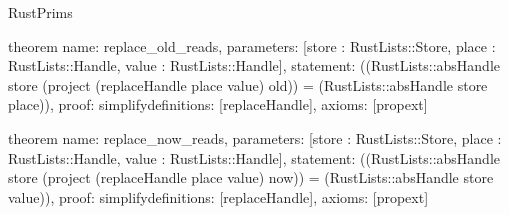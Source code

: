 \begin{lexlean}{RustPrims}
\begin{semanticmodule}
theorem{
  name: replace_old_reads,
  parameters: [store : RustLists::Store, place : RustLists::Handle, value : RustLists::Handle],
  statement: ((RustLists::absHandle store (project (replaceHandle place value) old)) = (RustLists::absHandle store place)),
  proof: simplify{definitions: [replaceHandle]},
  axioms: [propext]
}

theorem{
  name: replace_now_reads,
  parameters: [store : RustLists::Store, place : RustLists::Handle, value : RustLists::Handle],
  statement: ((RustLists::absHandle store (project (replaceHandle place value) now)) = (RustLists::absHandle store value)),
  proof: simplify{definitions: [replaceHandle]},
  axioms: [propext]
}
\end{semanticmodule}
\end{lexlean}
